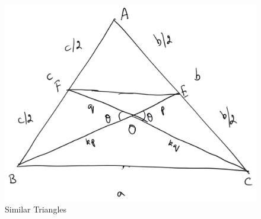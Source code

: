\begin{figure}[!h]
	\begin{center}
		
		\includegraphics[width=\columnwidth]{./figs/ch2_median_ratio_val}
		\vspace*{-10cm}
	\end{center}
	\caption{Similar Triangles}
	\label{ch2_sim_triang}	
\end{figure}

